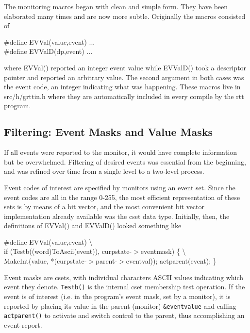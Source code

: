 The monitoring macros began with clean and simple form. They have been
elaborated many times and are now more subtle. Originally the macros
consisted of

\begin{iconcode}
\#define EVVal(value,event) ... \\
\#define EVValD(dp,event) ...
\end{iconcode}

\noindent
where EVVal() reported an integer event value while EVValD() took a
descriptor pointer and reported an arbitrary value. The second
argument in both cases was the event code, an integer indicating what
was happening.  These macros live in src/h/grttin.h where they are
automatically included in every compile by the rtt program.

\subsection{Filtering: Event Masks and Value Masks}

If all events were reported to the monitor, it would have complete
information but be overwhelmed. Filtering of desired events was
essential from the beginning, and was refined over time from a single
level to a two-level process.

Event codes of interest are specified by monitors using an event
set. Since the event codes are all in the range 0-255, the most
efficient representation of these sets is by means of a bit vector,
and the most convenient bit vector implementation already available
was the cset data type.  Initially, then, the definitions of EVVal()
and EVValD() looked something like

\begin{iconcode}
\#define EVVal(value,event) {\textbackslash} \\
\>   if (Testb((word)ToAscii(event)), curpstate-$>$eventmask) \{ {\textbackslash} \\
\>\>      MakeInt(value, *(curpstate-$>$parent-$>$eventval)); actparent(event); \}
\end{iconcode}

Event masks are csets, with individual characters ASCII values
indicating which event they denote. \texttt{Testb()} is the internal
cset membership test operation.  If the event is of interest (i.e. in
the program's event mask, set by a monitor), it is reported by placing
its value in the parent (monitor) \texttt{\&eventvalue} and calling
\texttt{actparent()} to activate and switch control to the parent,
thus accomplishing an event report.


